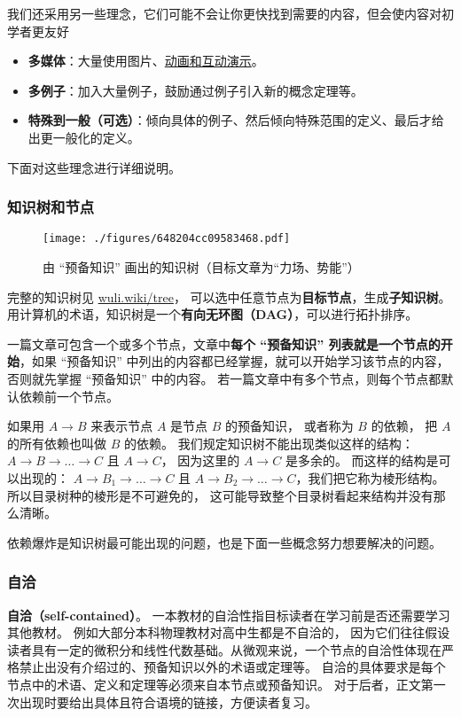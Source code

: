 我们还采用另一些理念，它们可能不会让你更快找到需要的内容，但会使内容对初学者更友好
\begin{itemize}
\item \textbf{多媒体}：大量使用图片、\href{https://wuli.wiki/apps/}{动画和互动演示}。
\item \textbf{多例子}：加入大量例子，鼓励通过例子引入新的概念定理等。
\item \textbf{特殊到一般（可选）}：倾向具体的例子、然后倾向特殊范围的定义、最后才给出更一般化的定义。
\end{itemize}
下面对这些理念进行详细说明。


\subsubsection{知识树和节点}
\begin{figure}[ht]
\centering
\texttt{[image: ./figures/648204cc09583468.pdf]}
\caption{由 “预备知识” 画出的知识树（目标文章为“力场、势能”）}\label{fig_about_1}
\end{figure}

完整的知识树见 \href{https://wuli.wiki/tree}{wuli.wiki/tree}， 可以选中任意节点为\textbf{目标节点}，生成\textbf{子知识树}。 用计算机的术语，知识树是一个\textbf{有向无环图（DAG）}，可以进行拓扑排序。 %

一篇文章可包含一个或多个节点，文章中\textbf{每个 “预备知识” 列表就是一个节点的开始}，如果 “预备知识” 中列出的内容都已经掌握，就可以开始学习该节点的内容，否则就先掌握 “预备知识” 中的内容。 若一篇文章中有多个节点，则每个节点都默认依赖前一个节点。

如果用 $A\to B$ 来表示节点 $A$ 是节点 $B$ 的预备知识， 或者称为 $B$ 的依赖， 把 $A$ 的所有依赖也叫做 $B$ 的依赖。 我们规定知识树不能出现类似这样的结构： $A \to B \to \dots \to C$ 且 $A \to C$， 因为这里的 $A \to C$ 是多余的。 而这样的结构是可以出现的： $A \to B_1 \to \dots \to C$ 且 $A \to B_2 \to \dots \to C$，我们把它称为棱形结构。 所以目录树种的棱形是不可避免的， 这可能导致整个目录树看起来结构并没有那么清晰。

依赖爆炸是知识树最可能出现的问题，也是下面一些概念努力想要解决的问题。

\subsubsection{自洽}
\textbf{自洽（self-contained）}。 一本教材的自洽性指目标读者在学习前是否还需要学习其他教材。 例如大部分本科物理教材对高中生都是不自洽的， 因为它们往往假设读者具有一定的微积分和线性代数基础。从微观来说，一个节点的自洽性体现在严格禁止出没有介绍过的、预备知识以外的术语或定理等。 自洽的具体要求是每个节点中的术语、定义和定理等必须来自本节点或预备知识。 对于后者，正文第一次出现时要给出具体且符合语境的链接，方便读者复习。

